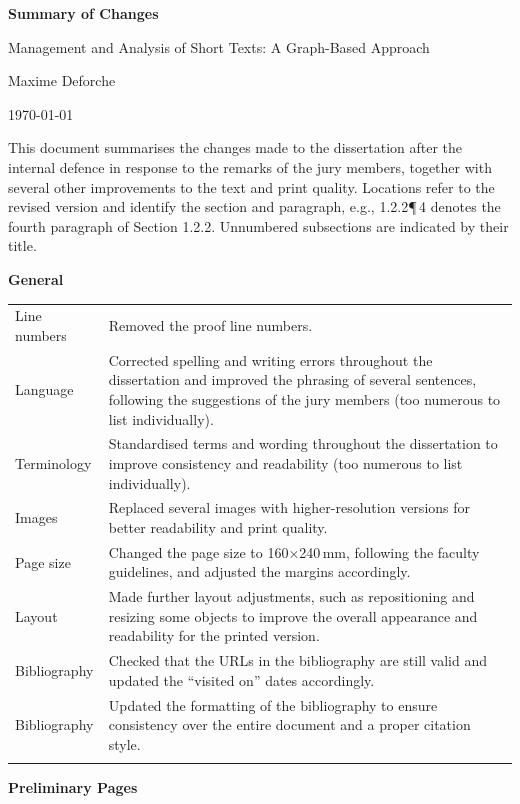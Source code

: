 \documentclass[11pt,a4paper]{article}
\makeatletter
\newcommand{\heading}[1]{%
  \par\addvspace{1.5em}%
  {\raggedright\large\bfseries #1\par}\nopagebreak[4]%
  \vspace{0.2em}\nopagebreak[4]%
}
\newlength{\loccol}
\newenvironment{changes}{%
  \begin{tabular}{@{}>{\raggedright\arraybackslash}p{\loccol}
                     >{\raggedright\arraybackslash}p{\dimexpr\textwidth-\loccol-2\tabcolsep\relax}@{}}
    \toprule
}{%
    \bottomrule
  \end{tabular}\par
}
\newcommand{\change}[2]{#1 & #2 \\ \addlinespace[0.45em]}
\newcommand{\loc}[2]{#1\enspace #2}
\makeatother
\begin{document}
\begin{center}
  {\LARGE\bfseries Summary of Changes\par}
  \vspace{0.4em}
  {\large Management and Analysis of Short Texts: A Graph-Based Approach\par}
  \vspace{0.8em}
  Maxime Deforche\par
  \today\par
\end{center}
\vspace{0.6em}

This document summarises the changes made to the dissertation after the internal defence in response to the remarks of the jury members, together with several other improvements to the text and print quality.
Locations refer to the revised version and identify the section and paragraph, e.g., 1.2.2\enspace ¶\,4 denotes the fourth paragraph of Section 1.2.2.
Unnumbered subsections are indicated by their title.

\heading{General}

\begin{changes}
  \change{\loc{Line numbers}{}}{Removed the proof line numbers.}
  \change{\loc{Language}{}}{Corrected spelling and writing errors throughout the dissertation and improved the phrasing of several sentences, following the suggestions of the jury members (too numerous to list individually).}
  \change{\loc{Terminology}{}}{Standardised terms and wording throughout the dissertation to improve consistency and readability (too numerous to list individually).}
  \change{\loc{Images}{}}{Replaced several images with higher-resolution versions for better readability and print quality.}
  \change{\loc{Page size}{}}{Changed the page size to 160×240\,mm, following the faculty guidelines, and adjusted the margins accordingly.}
  \change{\loc{Layout}{}}{Made further layout adjustments, such as repositioning and resizing some objects to improve the overall appearance and readability for the printed version.}
  \change{\loc{Bibliography}{}}{Checked that the URLs in the bibliography are still valid and updated the ``visited on'' dates accordingly.}
  \change{\loc{Bibliography}{}}{Updated the formatting of the bibliography to ensure consistency over the entire document and a proper citation style.}
\end{changes}

\heading{Preliminary Pages}
\end{document}
